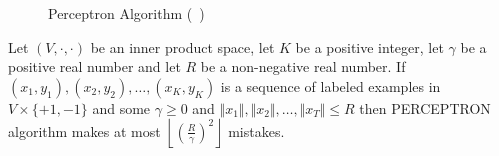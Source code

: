 \begin{figure}[hbt!]
  \begin{algorithm}[H]
    \SetAlgoLined
    \DontPrintSemicolon
    \end{algorithm}
    \caption{Perceptron Algorithm (~\cite{rosenblatt58a})}
  \label{fig:alg-perceptron}
\end{figure}

\begin{theorem}
  \label{theorem-perceptron}
  Let $(V,\cdot,\cdot)$ be an inner product space, let $K$ be a
  positive integer, let $\gamma$ be a positive real number and let $R$ be a non-negative real number. If $(x_1,y_1),(x_2,y_2),\dots,(x_K,y_K)$
  is a sequence of labeled examples in $V\times\{+1,-1\}$ and some $\gamma\geq 0$ and
  $\Vert x_1\Vert ,\Vert x_2\Vert ,\dots,\Vert x_T \Vert\leq R$ then PERCEPTRON algorithm makes at most $\left\lfloor \left( \frac{R}{\gamma} \right)^2\right\rfloor$ mistakes.
\end{theorem}

